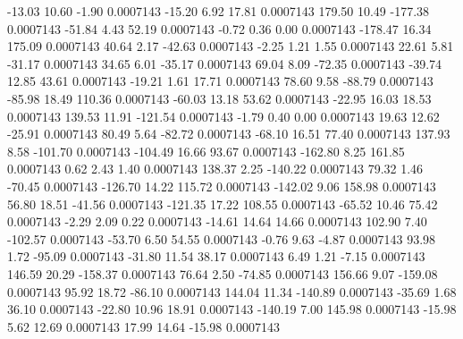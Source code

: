       -13.03       10.60       -1.90     0.0007143
      -15.20        6.92       17.81     0.0007143
      179.50       10.49     -177.38     0.0007143
      -51.84        4.43       52.19     0.0007143
       -0.72        0.36        0.00     0.0007143
     -178.47       16.34      175.09     0.0007143
       40.64        2.17      -42.63     0.0007143
       -2.25        1.21        1.55     0.0007143
       22.61        5.81      -31.17     0.0007143
       34.65        6.01      -35.17     0.0007143
       69.04        8.09      -72.35     0.0007143
      -39.74       12.85       43.61     0.0007143
      -19.21        1.61       17.71     0.0007143
       78.60        9.58      -88.79     0.0007143
      -85.98       18.49      110.36     0.0007143
      -60.03       13.18       53.62     0.0007143
      -22.95       16.03       18.53     0.0007143
      139.53       11.91     -121.54     0.0007143
       -1.79        0.40        0.00     0.0007143
       19.63       12.62      -25.91     0.0007143
       80.49        5.64      -82.72     0.0007143
      -68.10       16.51       77.40     0.0007143
      137.93        8.58     -101.70     0.0007143
     -104.49       16.66       93.67     0.0007143
     -162.80        8.25      161.85     0.0007143
        0.62        2.43        1.40     0.0007143
      138.37        2.25     -140.22     0.0007143
       79.32        1.46      -70.45     0.0007143
     -126.70       14.22      115.72     0.0007143
     -142.02        9.06      158.98     0.0007143
       56.80       18.51      -41.56     0.0007143
     -121.35       17.22      108.55     0.0007143
      -65.52       10.46       75.42     0.0007143
       -2.29        2.09        0.22     0.0007143
      -14.61       14.64       14.66     0.0007143
      102.90        7.40     -102.57     0.0007143
      -53.70        6.50       54.55     0.0007143
       -0.76        9.63       -4.87     0.0007143
       93.98        1.72      -95.09     0.0007143
      -31.80       11.54       38.17     0.0007143
        6.49        1.21       -7.15     0.0007143
      146.59       20.29     -158.37     0.0007143
       76.64        2.50      -74.85     0.0007143
      156.66        9.07     -159.08     0.0007143
       95.92       18.72      -86.10     0.0007143
      144.04       11.34     -140.89     0.0007143
      -35.69        1.68       36.10     0.0007143
      -22.80       10.96       18.91     0.0007143
     -140.19        7.00      145.98     0.0007143
      -15.98        5.62       12.69     0.0007143
       17.99       14.64      -15.98     0.0007143
